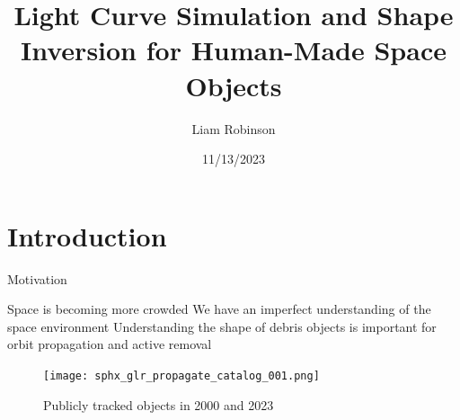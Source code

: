 \documentclass{beamer}
\title[]{Light Curve Simulation and Shape Inversion for Human-Made Space Objects}
\author[]{Liam Robinson}
\institute{Purdue Space Information Dynamics Group}
\date{11/13/2023}
\begin{document}
 
{
    \begin{frame}[plain]
    \titlepage
    \end{frame}
}

\section{Introduction}

\begin{frame}{Motivation}
    \begin{outline}
        \1 Space is becoming more crowded
        \1 We have an imperfect understanding of the space environment
        \1 Understanding the shape of debris objects is important for orbit propagation and active removal
    \end{outline}

    \begin{figure}
        \centering
        \texttt{[image: sphx\_glr\_propagate\_catalog\_001.png]}
        \label{fig:debris}
        \caption{Publicly tracked objects in 2000 and 2023}
    \end{figure}
\end{frame}
\end{document}
